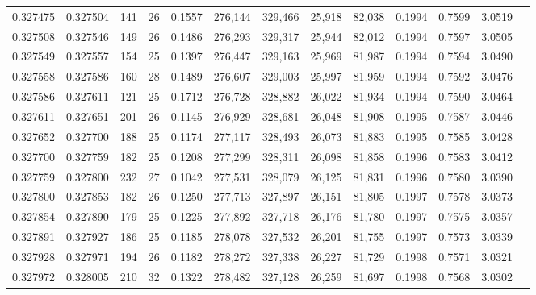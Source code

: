 \begin{tabular}{rrrrrrrrrrrrr}
0.327475 & 0.327504 &   141 &  26 &                                     0.1557 & 276,144 & 329,466 &  25,918 &  82,038 & 0.1994 & 0.7599 & 3.0519 \\
0.327508 & 0.327546 &   149 &  26 &                                     0.1486 & 276,293 & 329,317 &  25,944 &  82,012 & 0.1994 & 0.7597 & 3.0505 \\
0.327549 & 0.327557 &   154 &  25 &                                     0.1397 & 276,447 & 329,163 &  25,969 &  81,987 & 0.1994 & 0.7594 & 3.0490 \\
0.327558 & 0.327586 &   160 &  28 &                                     0.1489 & 276,607 & 329,003 &  25,997 &  81,959 & 0.1994 & 0.7592 & 3.0476 \\
0.327586 & 0.327611 &   121 &  25 &                                     0.1712 & 276,728 & 328,882 &  26,022 &  81,934 & 0.1994 & 0.7590 & 3.0464 \\
0.327611 & 0.327651 &   201 &  26 &                                     0.1145 & 276,929 & 328,681 &  26,048 &  81,908 & 0.1995 & 0.7587 & 3.0446 \\
0.327652 & 0.327700 &   188 &  25 &                                     0.1174 & 277,117 & 328,493 &  26,073 &  81,883 & 0.1995 & 0.7585 & 3.0428 \\
0.327700 & 0.327759 &   182 &  25 &                                     0.1208 & 277,299 & 328,311 &  26,098 &  81,858 & 0.1996 & 0.7583 & 3.0412 \\
0.327759 & 0.327800 &   232 &  27 &                                     0.1042 & 277,531 & 328,079 &  26,125 &  81,831 & 0.1996 & 0.7580 & 3.0390 \\
0.327800 & 0.327853 &   182 &  26 &                                     0.1250 & 277,713 & 327,897 &  26,151 &  81,805 & 0.1997 & 0.7578 & 3.0373 \\
0.327854 & 0.327890 &   179 &  25 &                                     0.1225 & 277,892 & 327,718 &  26,176 &  81,780 & 0.1997 & 0.7575 & 3.0357 \\
0.327891 & 0.327927 &   186 &  25 &                                     0.1185 & 278,078 & 327,532 &  26,201 &  81,755 & 0.1997 & 0.7573 & 3.0339 \\
0.327928 & 0.327971 &   194 &  26 &                                     0.1182 & 278,272 & 327,338 &  26,227 &  81,729 & 0.1998 & 0.7571 & 3.0321 \\
0.327972 & 0.328005 &   210 &  32 &                                     0.1322 & 278,482 & 327,128 &  26,259 &  81,697 & 0.1998 & 0.7568 & 3.0302 \\

\end{tabular}
